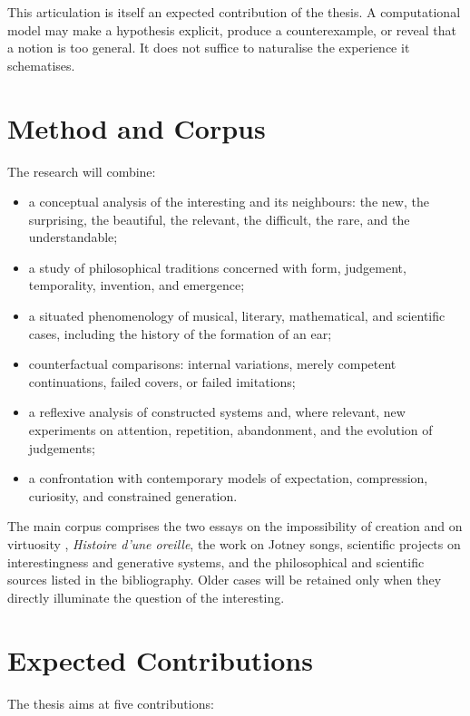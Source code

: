 \documentclass[11pt,a4paper]{article}
\begin{document}
This articulation is itself an expected contribution of the thesis. A
computational model may make a hypothesis explicit, produce a counterexample, or
reveal that a notion is too general. It does not suffice to naturalise the
experience it schematises.

\section{Method and Corpus}

The research will combine:

\begin{itemize}
  \item a conceptual analysis of the interesting and its neighbours: the new,
        the surprising, the beautiful, the relevant, the difficult, the rare,
        and the understandable;
  \item a study of philosophical traditions concerned with form, judgement,
        temporality, invention, and emergence;
  \item a situated phenomenology of musical, literary, mathematical, and
        scientific cases, including the history of the formation of an ear;
  \item counterfactual comparisons: internal variations, merely competent
        continuations, failed covers, or failed imitations;
  \item a reflexive analysis of constructed systems and, where relevant, new
        experiments on attention, repetition, abandonment, and the evolution of
        judgements;
  \item a confrontation with contemporary models of expectation, compression,
        curiosity, and constrained generation.
\end{itemize}

The main corpus comprises the two essays on the impossibility of creation and on
virtuosity \parencite{pachet2026impossibilite,pachet2026virtuosite},
\emph{Histoire d'une oreille}, the work on Jotney songs, scientific projects on
interestingness and generative systems, and the philosophical and scientific
sources listed in the bibliography. Older cases will be retained only when they
directly illuminate the question of the interesting.

\section{Expected Contributions}

The thesis aims at five contributions:
\end{document}
